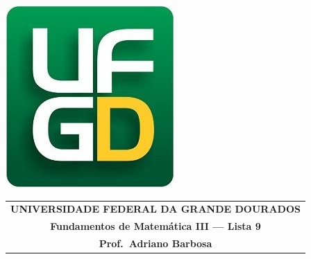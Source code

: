 \documentclass[a4paper,5pt]{amsbook}
\begin{document}
\thispagestyle{empty}
\pagestyle{empty}
\begin{minipage}[h]{0.14\textwidth}
	\includegraphics[scale=0.24]{../ufgd.png}
\end{minipage}
\begin{minipage}[h]{\textwidth}
\begin{tabular}{c}
{{\bf UNIVERSIDADE FEDERAL DA GRANDE DOURADOS}}\\
{{\bf Fundamentos de Matem\'{a}tica III --- Lista 9}}\\
{{\bf Prof.\ Adriano Barbosa}}\\
\end{tabular}
\vspace{-0.45cm}
%
\end{minipage}

\end{document}
